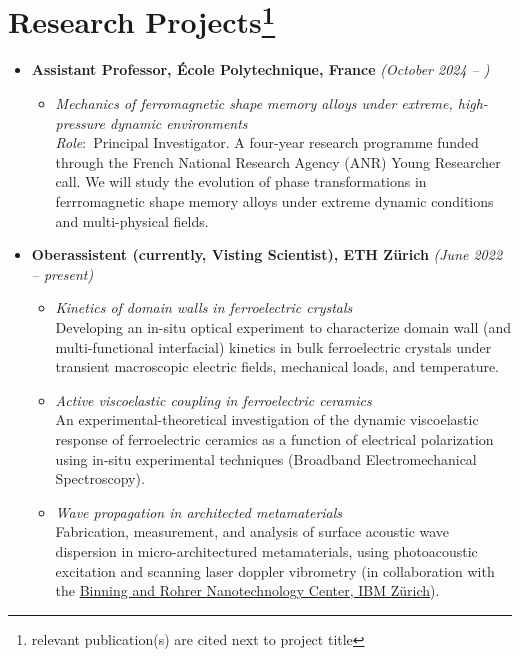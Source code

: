\documentclass[a4paper,10pt, oneside]{article}
\begin{document}
	\section*{{Research Projects}\footnote[2]{relevant publication(s) are cited next to project title}}
	\begin{itemize}[wide, labelwidth=!, labelindent=-1em]
		\item[]\textbf{Assistant Professor, \'{E}cole Polytechnique, France} \hfill \textit{(October 2024 -- )}
		\begin{itemize}[wide, labelwidth=!, labelindent=0em]
			\item \textit{Mechanics of ferromagnetic shape memory alloys under extreme, high-pressure dynamic environments} \\
			\textit{Role}:~Principal Investigator. A four-year research programme funded through the French National Research Agency (ANR) Young Researcher call. We will study the evolution of phase transformations in ferrromagnetic shape memory alloys under extreme dynamic conditions and multi-physical fields.
		\end{itemize}
		\vspace*{1em}
		\item[]\textbf{Oberassistent (currently, Visting Scientist), ETH Z\"{u}rich} \hfill \textit{(June 2022 -- present)}
		\begin{itemize}[wide, labelwidth=!, labelindent=0em]
			\item \textit{Kinetics of domain walls in ferroelectric crystals} \\
			Developing an in-situ optical experiment to characterize domain wall (and multi-functional interfacial) kinetics in bulk ferroelectric crystals under transient macroscopic electric fields, mechanical loads, and temperature.
			\item\textit{Active viscoelastic coupling in ferroelectric ceramics} \\
			An experimental-theoretical investigation of the dynamic viscoelastic response of ferroelectric ceramics as a function of electrical polarization using in-situ experimental techniques (Broadband Electromechanical Spectroscopy).
			\item \textit{Wave propagation in architected metamaterials} \\
			Fabrication, measurement, and analysis of surface acoustic wave dispersion in micro-architectured metamaterials, using photoacoustic excitation and scanning laser doppler vibrometry (in collaboration with the \href{https://www.zurich.ibm.com/brnc/}{Binning and Rohrer Nanotechnology Center, IBM Z\"{u}rich}).		

\end{itemize}
\end{itemize}
\end{document}
